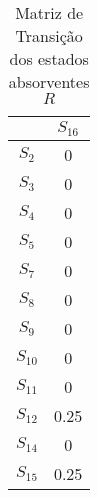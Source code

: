 \begin{table}[H]
    \centering
        \begin{tabular}{c|c} & $S_{16}$ \\ \hline $S_2$ & 0 \\ $S_3$ & 0 \\ $S_4$ & 0 \\ $S_5$ & 0 \\ $S_7$ & 0 \\ $S_8$ & 0 \\ $S_9$ & 0 \\ $S_{10}$ & 0 \\ $S_{11}$ & 0 \\ $S_{12}$ & 0.25 \\ $S_{14}$ & 0 \\ $S_{15}$ & 0.25 \\ \end{tabular}
    \caption{Matriz de Transição dos estados absorventes $R$}
    \label{tab:matriz_transicao_R}
\end{table}

